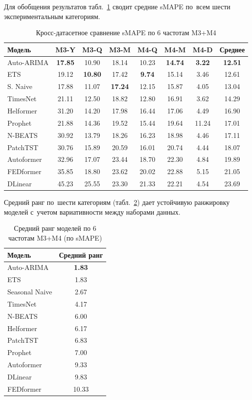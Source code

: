 Для обобщения результатов табл.~\ref{tab:cross-smape} сводит средние
sMAPE по~всем шести экспериментальным категориям.

\begin{table}[H]
\centering
\caption{Кросс-датасетное сравнение sMAPE по 6 частотам M3+M4}
\label{tab:cross-smape}
\small
\begin{tabular}{@{}lcccccc|c@{}}
\toprule
Модель & M3-Y & M3-Q & M3-M & M4-Q & M4-M & M4-D & Среднее \\
\midrule
Auto-ARIMA     & \textbf{17.85} & 10.90 & 18.14 & 10.23 & \textbf{14.74} &  \textbf{3.22} & \textbf{12.51} \\
ETS            & 19.12 & \textbf{10.80} & 17.42 & \textbf{9.74} & 15.14 &  3.46 & 12.61 \\
S. Naive       & 17.88 & 11.07 & \textbf{17.24} & 12.15 & 15.87 &  4.05 & 13.04 \\
TimesNet       & 21.11 & 12.50 & 18.82 & 12.80 & 16.91 &  3.62 & 14.29 \\
\midrule
Helformer      & 31.20 & 14.20 & 17.98 & 16.44 & 17.06 &  4.49 & 16.90 \\
Prophet        & 21.88 & 14.36 & 19.52 & 15.44 & 19.64 & 11.24 & 17.01 \\
N-BEATS        & 30.92 & 13.79 & 18.26 & 16.23 & 18.98 &  4.46 & 17.11 \\
PatchTST       & 30.76 & 15.89 & 20.59 & 16.01 & 20.74 &  4.44 & 18.07 \\
\midrule
Autoformer     & 32.96 & 17.07 & 23.44 & 18.70 & 22.30 &  4.84 & 19.89 \\
FEDformer      & 35.85 & 18.80 & 23.62 & 20.02 & 22.88 &  5.15 & 21.05 \\
DLinear        & 45.23 & 25.55 & 23.30 & 21.33 & 22.21 &  4.54 & 23.69 \\
\end{tabular}
\end{table}

Средний ранг по~шести категориям (табл.~\ref{tab:mean-rank}) дает
устойчивую ранжировку моделей с~учетом вариативности между наборами данных.

\begin{table}[H]
\centering
\caption{Средний ранг моделей по 6 частотам M3+M4 (по sMAPE)}
\label{tab:mean-rank}
\small
\begin{tabular}{@{}lc@{}}
\toprule
Модель & Средний ранг \\
\midrule
Auto-ARIMA     & \textbf{1.83} \\
ETS            & 1.83 \\
Seasonal Naive & 2.67 \\
TimesNet       & 4.17 \\
N-BEATS        & 6.00 \\
Helformer      & 6.17 \\
PatchTST       & 6.83 \\
Prophet        & 7.00 \\
Autoformer     & 9.33 \\
DLinear        & 9.83 \\
FEDformer      & 10.33 \\
\end{tabular}
\end{table}


